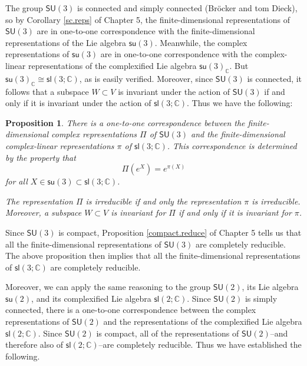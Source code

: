 \documentclass{amsbook}
\theoremstyle{plain}
\newtheorem{proposition}[theorem]{Proposition}
\numberwithin{equation}{chapter}
\numberwithin{theorem}{chapter}
\begin{document}
The group $\mathsf{SU}(3)$ is connected and simply connected (Br\"ocker and
tom Dieck), so by Corollary \ref{sc.reps} of Chapter 5, the finite-dimensional
representations of $\mathsf{SU}(3)$ are in one-to-one correspondence with the
finite-dimensional representations of the Lie algebra $\mathsf{su}(3)$.
Meanwhile, the complex representations of $\mathsf{su}(3)$ are in one-to-one
correspondence with the complex-linear representations of the complexified Lie
algebra $\mathsf{su}(3)_{\mathbb{C}}$. But $\mathsf{su}(3)_{\mathbb{C}}%
\cong\mathsf{sl}\left(  3;\mathbb{C}\right)  $, as is easily verified.
Moreover, since $\mathsf{SU}(3)$ is connected, it follows that a subspace
$W\subset V$ is invariant under the action of $\mathsf{SU}(3)$ if and only if
it is invariant under the action of $\mathsf{sl}\left(  3;\mathbb{C}\right)
$. Thus we have the following:

\begin{proposition}
There is a one-to-one correspondence between the finite-dimensional complex
representations $\Pi$ of $\mathsf{SU}(3)$ and the finite-dimensional
complex-linear representations $\pi$ of $\mathsf{sl}\left(  3;\mathbb{C}%
\right)  $. This correspondence is determined by the property that
\[
\Pi\left(  e^{X}\right)  =e^{\pi(X)}%
\]
for all $X\in\mathsf{su}(3)\subset\mathsf{sl}\left(  3;\mathbb{C}\right)  $.

The representation $\Pi$ is irreducible if and only the representation $\pi$
is irreducible. Moreover, a subspace $W\subset V$ is invariant for $\Pi$ if
and only if it is invariant for $\pi$.
\end{proposition}

Since $\mathsf{SU}(3)$ is compact, Proposition \ref{compact.reduce} of Chapter
5 tells us that all the finite-dimensional representations of $\mathsf{SU}(3)$
are completely reducible. The above proposition then implies that all the
finite-dimensional representations of $\mathsf{sl}\left(  3;\mathbb{C}\right)
$ are completely reducible.

Moreover, we can apply the same reasoning to the group $\mathsf{SU}(2)$, its
Lie algebra $\mathsf{su}(2)$, and its complexified Lie algebra $\mathsf{sl}%
(2;\mathbb{C})$. Since $\mathsf{SU}(2)$ is simply connected, there is a
one-to-one correspondence between the complex representations of
$\mathsf{SU}(2)$ and the representations of the complexified Lie algebra
$\mathsf{sl}(2;\mathbb{C})$. Since $\mathsf{SU}(2)$ is compact, all of the
representations of $\mathsf{SU}(2)$--and therefore also of $\mathsf{sl}%
(2;\mathbb{C})$--are completely reducible. Thus we have established the following.
\end{document}
